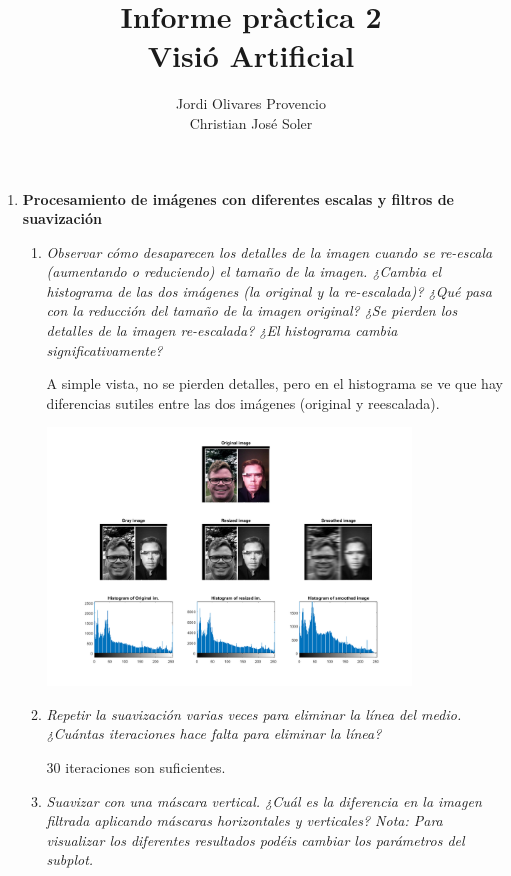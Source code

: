\documentclass{article}
\title{Informe pràctica 2\\Visió Artificial}
\author{Jordi Olivares Provencio\\Christian José Soler}
\begin{document}
\maketitle

\begin{enumerate}

 \item \textbf{Procesamiento de imágenes con diferentes escalas y filtros 
de suavización}

 \begin{enumerate}

 \item \textit{Observar  cómo  desaparecen  los  detalles  de  la  imagen  cuando  se  re-escala 
(aumentando o reduciendo) el  tamaño de la imagen. ¿Cambia el histograma de 
las  dos imágenes  (la  original  y la  re-escalada)?  ¿Qué  pasa  con la  reducción  del 
tamaño de la imagen original? ¿Se pierden los detalles de la imagen re-escalada? 
¿El histograma cambia significativamente? }
 
 A simple vista, no se pierden detalles, pero en el histograma se ve que hay diferencias sutiles entre las dos imágenes (original y reescalada). 

  \begin{center}
 \includegraphics[width=0.8\textwidth]{1a.png}
 \end{center}

 \item \textit{Repetir la suavización varias veces para eliminar la línea del medio. ¿Cuántas iteraciones hace falta para eliminar la línea?}

 30 iteraciones son suficientes.

 \item \textit{Suavizar  con  una  máscara  vertical.  ¿Cuál  es  la  diferencia  en  la  imagen  filtrada 
aplicando  máscaras  horizontales  y  verticales? Nota: Para  visualizar  los 
diferentes resultados podéis cambiar los parámetros del subplot.}


\end{enumerate}
\end{enumerate}
\end{document}
